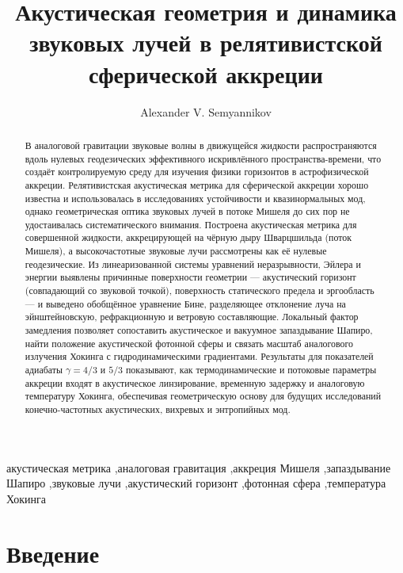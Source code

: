 \documentclass[12pt,a4paper,preprint]{elsarticle}
\begin{document}
    \begin{frontmatter}
        \title{Акустическая геометрия и динамика звуковых лучей в релятивистской сферической аккреции}
        \author{Alexander V. Semyannikov}
        \address{Independent Researcher \\ \textit{Email: avsemyannikov@gmail.com}}
        \begin{abstract}
            В аналоговой гравитации звуковые волны в движущейся жидкости распространяются вдоль нулевых геодезических эффективного искривлённого пространства-времени, что создаёт контролируемую среду для изучения физики горизонтов в астрофизической аккреции. Релятивистская акустическая метрика для сферической аккреции хорошо известна и использовалась в исследованиях устойчивости и квазинормальных мод, однако геометрическая оптика звуковых лучей в потоке Мишеля до сих пор не удостаивалась систематического внимания. Построена акустическая метрика для совершенной жидкости, аккрецирующей на чёрную дыру Шварцшильда (поток Мишеля), а высокочастотные звуковые лучи рассмотрены как её нулевые геодезические. Из линеаризованной системы уравнений неразрывности, Эйлера и энергии выявлены причинные поверхности геометрии --- акустический горизонт (совпадающий со звуковой точкой), поверхность статического предела и эргообласть --- и выведено обобщённое уравнение Бине, разделяющее отклонение луча на эйнштейновскую, рефракционную и ветровую составляющие. Локальный фактор замедления позволяет сопоставить акустическое и вакуумное запаздывание Шапиро, найти положение акустической фотонной сферы и связать масштаб аналогового излучения Хокинга с гидродинамическими градиентами. Результаты для показателей адиабаты $\gamma=4/3$ и $5/3$ показывают, как термодинамические и потоковые параметры аккреции входят в акустическое линзирование, временную задержку и аналоговую температуру Хокинга, обеспечивая геометрическую основу для будущих исследований конечно-частотных акустических, вихревых и энтропийных мод.
        \end{abstract}
        \begin{keyword}
            акустическая метрика \sep аналоговая гравитация \sep аккреция Мишеля \sep запаздывание Шапиро \sep звуковые лучи \sep акустический горизонт \sep фотонная сфера \sep температура Хокинга
        \end{keyword}
    \end{frontmatter}

    \section{Введение}\label{sec:introduction}
\end{document}

